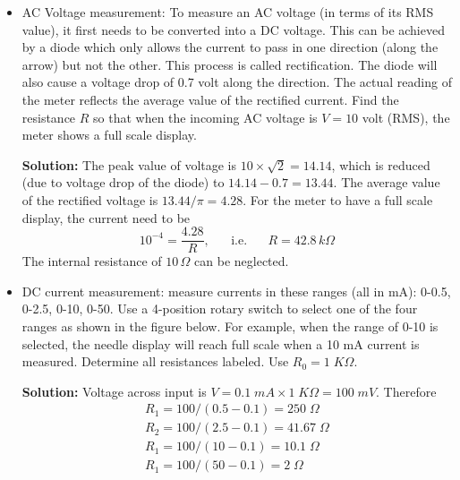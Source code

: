 \begin{enumerate}
\begin{itemize}

      {\bf Solution:} $R_1=25\;K\Omega$, $R_2=75\;K\Omega$, $R_3=400\;K\Omega$

      and $R_4=2\;M\Omega$.
    \item AC Voltage measurement: To measure an AC voltage (in terms of its
      RMS value), it first needs to be converted into a DC voltage. This can 
      be achieved by a diode which only allows the current to pass in one
      direction (along the arrow) but not the other. This process is called
      rectification. The diode will also cause a voltage drop of 0.7 volt 
      along the direction. The actual reading of the meter reflects the 
      average value of the rectified current. Find the resistance $R$ so 
      that when the incoming AC voltage is $V=10$ volt (RMS), the meter shows 
      a full scale display.


      {\bf Solution:} The peak value of voltage is $10\times \sqrt{2}=14.14$,
      which is reduced (due to voltage drop of the diode) to $14.14-0.7=13.44$.
      The average value of the rectified voltage is $13.44/\pi=4.28$. For the
      meter to have a full scale display, the current need to be
      \[ 10^{-4}=\frac{4.28}{R},\;\;\;\;\;\;\mbox{i.e.}\;\;\;\;\;\;R=42.8\,k\Omega \]
      The internal resistance of $10\,\Omega$ can be neglected.

    \item DC current measurement: measure currents in these ranges (all in mA):
      0-0.5, 0-2.5, 0-10, 0-50. Use a 4-position rotary switch to select one 
      of the four ranges as shown in the figure below. For example, when the 
      range of 0-10 is selected, the needle display will reach full scale when 
      a 10 mA current is measured. Determine all resistances labeled. Use
      $R_0=1\;K\Omega$.


      {\bf Solution:} Voltage across input is $V=0.1\;mA\times 1\;K\Omega=100\;mV$.
      Therefore 
      \[ \begin{array}{l}
        R_1=100/(0.5-0.1)=250\;\Omega \\
        R_2=100/(2.5-0.1)=41.67\;\Omega \\
        R_1=100/(10-0.1)=10.1\;\Omega \\
        R_1=100/(50-0.1)=2\;\Omega
      \end{array}
      \]


\end{itemize}
\end{enumerate}
